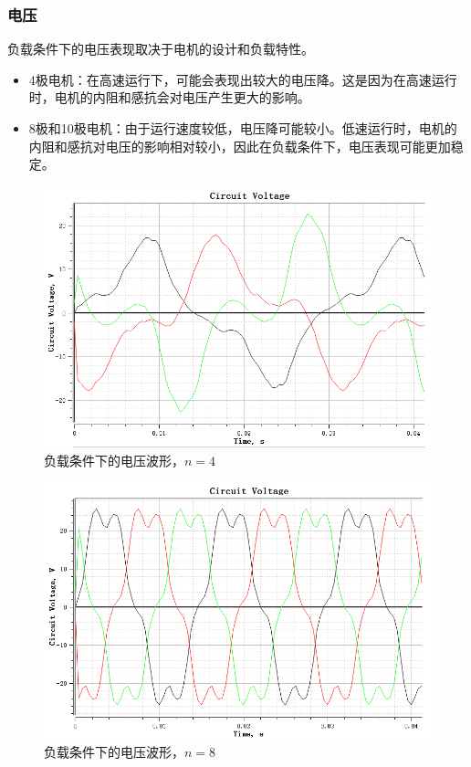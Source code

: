 \documentclass{thuemp}
\begin{document}
\subsubsection{电压}
负载条件下的电压表现取决于电机的设计和负载特性。
\begin{itemize}
	\item 4极电机：在高速运行下，可能会表现出较大的电压降。这是因为在高速运行时，电机的内阻和感抗会对电压产生更大的影响。
	\item 8极和10极电机：由于运行速度较低，电压降可能较小。低速运行时，电机的内阻和感抗对电压的影响相对较小，因此在负载条件下，电压表现可能更加稳定。
\end{itemize}

\begin{figure}[H]
  \centering
  \includegraphics[width=1\linewidth]{./img/task3/voltage-n4-load.png}
  \caption{负载条件下的电压波形，$n=4$}
\end{figure}
\begin{figure}[H]
  \centering
  \includegraphics[width=1\linewidth]{./img/task3/voltage-n8-load.png}
  \caption{负载条件下的电压波形，$n=8$}
\end{figure}
\end{document}
